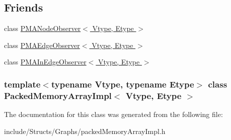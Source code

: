 \subsection*{Friends}
\begin{DoxyCompactItemize}
\item 
\hypertarget{class_packed_memory_array_impl_ab45e5dc3b78897d254e7a5dbad23a7e1}{
class \hyperlink{class_packed_memory_array_impl_ab45e5dc3b78897d254e7a5dbad23a7e1}{PMANodeObserver$<$ Vtype, Etype $>$}}
\label{class_packed_memory_array_impl_ab45e5dc3b78897d254e7a5dbad23a7e1}

\item 
\hypertarget{class_packed_memory_array_impl_ab65cc43b0805c58e68fe083b9fdf0bfd}{
class \hyperlink{class_packed_memory_array_impl_ab65cc43b0805c58e68fe083b9fdf0bfd}{PMAEdgeObserver$<$ Vtype, Etype $>$}}
\label{class_packed_memory_array_impl_ab65cc43b0805c58e68fe083b9fdf0bfd}

\item 
\hypertarget{class_packed_memory_array_impl_a44f58775821887f50ba75d3ba8337e84}{
class \hyperlink{class_packed_memory_array_impl_a44f58775821887f50ba75d3ba8337e84}{PMAInEdgeObserver$<$ Vtype, Etype $>$}}
\label{class_packed_memory_array_impl_a44f58775821887f50ba75d3ba8337e84}

\end{DoxyCompactItemize}
\subsubsection*{template$<$typename Vtype, typename Etype$>$ class PackedMemoryArrayImpl$<$ Vtype, Etype $>$}



The documentation for this class was generated from the following file:\begin{DoxyCompactItemize}
\item 
include/Structs/Graphs/packedMemoryArrayImpl.h\end{DoxyCompactItemize}
